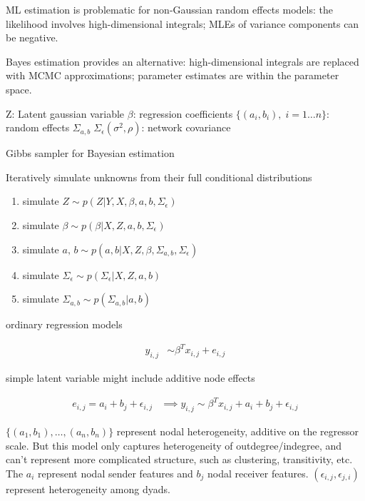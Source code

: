 ML estimation is problematic for non-Gaussian random effects models: the likelihood involves high-dimensional integrals; MLEs of variance components can be negative.

Bayes estimation provides an alternative: high-dimensional integrals are replaced with MCMC approximations; parameter estimates are within the parameter space.

Z: Latent gaussian variable
$\beta$: regression coefficients
$\{ (a_{i}, b_{i}), \; i=1 \ldots n \}$: random effects
$\Sigma_{a,b} \; \Sigma_{\epsilon}(\sigma^{2}, \rho)$: network covariance

Gibbs sampler for Bayesian estimation

Iteratively simulate unknowns from their full conditional distributions

\begin{enumerate}
	\item simulate $Z \sim p(Z | Y, X, \beta, a, b, \Sigma_{\epsilon})$
	\item simulate $\beta \sim p(\beta | X, Z, a, b, \Sigma_{\epsilon})$
	\item simulate $a, \,b \sim p(a,b | X, Z, \beta, \Sigma_{a,b}, \Sigma_{\epsilon})$
	\item simulate $\Sigma_{\epsilon} \sim p(\Sigma_{\epsilon} | X, Z, a, b)$
	\item simulate $\Sigma_{a,b} \sim p(\Sigma_{a,b} | a, b)$
\end{enumerate}


ordinary regression models

\begin{align}
y_{i,j} &\sim \beta^{T} x_{i,j} + e_{i,j}
\end{align}

simple latent variable might include additive node effects

\begin{align}
e_{i,j} = a_{i} + b_{j} + \epsilon_{i,j}  &\implies y_{i,j} \sim \beta^{T} x_{i,j} + a_{i} + b_{j} + \epsilon_{i,j}
\end{align}

$\{ (a_{1}, b_{1}), \ldots, (a_{n}, b_{n}) \}$ represent nodal heterogeneity, additive on the regressor scale. But this model only captures heterogeneity of outdegree/indegree, and can’t represent more complicated structure, such as clustering, transitivity, etc. The $a_{i}$ represent nodal sender features and $b_{j}$ nodal receiver features. $(\epsilon_{i,j}, \epsilon_{j,i})$ represent heterogeneity among dyads. 


